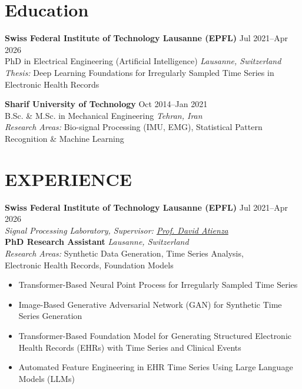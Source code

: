 \documentclass[10pt, letterpaper]{article}
\let\hrefWithoutArrow\href %
\renewcommand{\href}[2]{\hrefWithoutArrow{#1}{\ifthenelse{\equal{#2}{}}{ }{#2 }\raisebox{.15ex}{\footnotesize \faExternalLink*}}}
\begin{document}
\section{Education}

\textbf{Swiss Federal Institute of Technology Lausanne (EPFL)} \hfill Jul 2021--Apr 2026 \\
PhD in Electrical Engineering (Artificial Intelligence) \hfill \textit{Lausanne, Switzerland} \\
\textit{Thesis:} Deep Learning Foundations for Irregularly Sampled Time Series in Electronic Health Records
\vspace{0.5em}

\textbf{Sharif University of Technology} \hfill Oct 2014--Jan 2021 \\
B.Sc. \& M.Sc. in Mechanical Engineering \hfill \textit{Tehran, Iran}\\
\textit{Research Areas:} Bio-signal Processing (IMU, EMG), Statistical Pattern Recognition \& Machine Learning
\vspace{0.5em}

\section{EXPERIENCE}

\textbf{Swiss Federal Institute of Technology Lausanne (EPFL)} \hfill Jul 2021--Apr 2026 \\
\textit{Signal Processing Laboratory, Supervisor: \hrefWithoutArrow{https://people.epfl.ch/david.atienza}{Prof. David Atienza}} \\
\textbf{PhD Research Assistant} \hfill \textit{Lausanne, Switzerland}\\
\textit{Research Areas:} Synthetic Data Generation, Time Series Analysis,\\ Electronic Health Records, Foundation Models

\begin{itemize}
    \itemsep -3pt {}

    \item Transformer-Based Neural Point Process for Irregularly Sampled Time Series
    \item Image-Based Generative Adversarial Network (GAN) for Synthetic Time Series Generation
    \item Transformer-Based Foundation Model for Generating Structured Electronic Health Records (EHRs) with Time Series and Clinical Events
    \item Automated Feature Engineering in EHR Time Series Using Large Language Models (LLMs)
\end{itemize}
\end{document}
